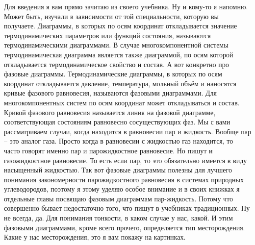 \documentclass[main.tex]{subfiles}
\begin{document}
Для введения я вам прямо зачитаю из своего учебника.
Ну и кому-то я напомню.
Может быть, изучали в зависимости от той специальности, которую
вы получаете.
Диаграммы, в которых по осям координат откладывается значение термодинамических параметров или функций состояния, называются термодинамическими диаграммами.
В случае многокомпонентной системы термодинамическая диаграмма является также диаграммой, по осям которой откладывается термодинамическое свойство и состав.
А вот конкретно про фазовые диаграммы.
Термодинамические диаграммы, в которых по осям координат откладывается давление, температура, мольный объём и наносятся кривые фазового равновесия, называются фазовыми диаграммами.
Для многокомпонентных систем по осям координат может откладываться и состав.
Кривой фазового равновесия называется линия на фазовой диаграмме, соответствующая состояниям равновесно сосуществующих фаз.
Мы с вами рассматриваем случаи, когда находится в равновесии пар и жидкость.
Вообще пар -- это аналог газа.
Просто когда в равновесии с жидкостью газ находится, то часто говорят именно пар и парожидкостное равновесие.
Но пишут и газожидкостное равновесие.
То есть если пар, то это обязательно имеется в виду насыщенный жидкостью.
Так вот фазовые диаграммы полезны для лучшего понимания закономерности парожидкостного равновесия в системах природных углеводородов, поэтому я этому уделяю особое внимание и в своих книжках я отдельные главы посвящаю фазовым диаграммам пар-жидкость.
Потому что совершенно бывает недостаточно того, что пишут в учебниках традиционных.
Ну не всегда, да.
Для понимания тонкости, в каком случае у нас, какой.
И этим фазовыми диаграммами, кроме всего прочего, определяется тип месторождения.
Какие у нас месторождения, это я вам покажу на картинках.
\end{document}
